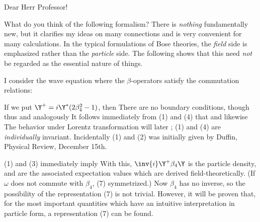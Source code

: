\date{April 6, 1939}

\nc{\D}{\partial}

Dear Herr Professor!

What do you think of the following formalism? There is \textit{nothing} fundamentally new, but it clarifies my ideas on many connections and is very convenient for many calculations. In the typical formulations of Bose theories, the \textit{field} side is emphasized rather than the \textit{particle} side. The following shows that this need \textit{not} be regarded as the essential nature of things.

I consider the wave equation
where the $\beta$-operators satisfy the commutation relations:

If we put $\Y^+ = i\Y^*(2\beta^2_4 - 1)$, then
There are no boundary conditions, though
\uequ{
\partial_\mu\partial_\rho\beta_\mu\beta_\nu\beta_\rho\Y =
-\kappa\partial_\mu\beta_\mu\beta_\nu\Y,
}
thus
and analogously
It follows immediately from (1) and (4) that
and likewise
The behavior under Lorentz transformation will later ; (1) and (4) are \textit{individually} invariant. Incidentally (1) and (2) was initially given by Duffin, Physical Review, December 15th.

(1) and (3) immediately imply
With this, $\inv{i}\Y^+\beta_4\Y$ is the particle density, and 
are the associated expectation values which are derived field-theoretically. (If $\omega$ does not commute with $\beta_4$, (7)  symmetrized.) Now $\beta_4$ has no inverse, so the possibility of the representation (7) is not trivial. However, it will be proven that, for the most important quantities which have an intuitive interpretation in particle form, a representation (7) can be found.

